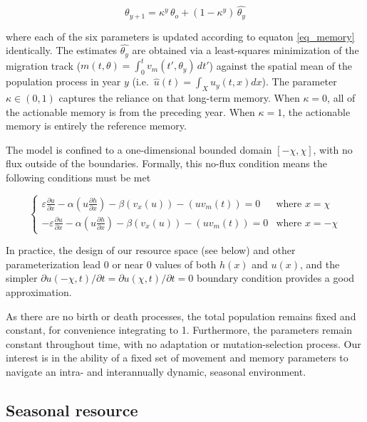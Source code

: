 \documentclass[utf8]{frontiersSCNS} %
\begin{document}
	\begin{equation}\label{eq_memory}
	\theta_{y+1} = \kappa^y \, \theta_o + \left(1-\kappa^y\right)\,\widehat{\theta_y} 
\end{equation}
	
	\noindent where each of the six parameters is updated according to equaton \ref{eq_memory} identically. The estimates $\widehat{\theta_y}$ are obtained via a least-squares minimization of the migration track ($m(t,\theta) = \int_0^t v_m(t',\theta_y) \, dt'$) against the spatial mean of the population process in year $y$ (i.e.~$\widehat{u}(t) = \int_X u_y(t, x) dx$). The parameter $\kappa \in (0,1)$ captures the reliance on that long-term memory. When $\kappa = 0$, all of the actionable memory is from the preceding year. When $\kappa = 1$, the actionable memory is entirely the reference memory.
	
	The model is confined to a one-dimensional bounded domain $[-\chi,\chi]$, with no flux outside of the boundaries. Formally, this no-flux condition means the following conditions must be met 
	
	$$
	\begin{cases}
		\varepsilon \frac{\partial u}{\partial x} - 		
	\alpha \left(u \frac{\partial h}{\partial x}\right) - \beta(v_x(u)) - (uv_m(t)) = 0 & \text{where}\,\, x = \chi\\
	-\varepsilon \frac{\partial u}{\partial x} - 
	\alpha \left(u \frac{\partial h}{\partial x}\right) - \beta(v_x(u)) - (uv_m(t)) = 0 & \text{where}\,\, x = -\chi
	\end{cases}
$$


	\noindent In practice, the design of our resource space (see below) and other parameterization lead 0 or near 0 values of both $h(x)$ and $u(x)$, and the simpler ${\partial u(-\chi,t)}/{\partial t} = {\partial u(\chi,t)}/{\partial t} =0$ boundary condition provides a good approximation. 
	
	As there are no birth or death processes, the total population remains fixed and constant, for convenience integrating to 1. Furthermore, the parameters remain constant throughout time, with no adaptation or mutation-selection process. Our interest is in the ability of a fixed set of movement and memory parameters to navigate an intra- and interannually dynamic, seasonal environment.
	
	
\subsection{Seasonal resource}
	
\end{document}
